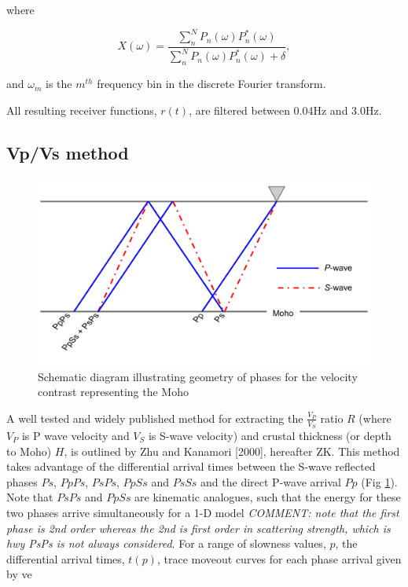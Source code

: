 \documentclass[draft, 12pt]{article}
\begin{document}
where

\begin{equation}
  X(\omega) = \frac {\sum_n^N P_n(\omega)P_n^*(\omega)} {\sum_n^N P_n(\omega)P_n^*(\omega) + \delta},
\end{equation}

and $\omega_m$ is the $m^{th}$ frequency bin in the discrete Fourier transform.

  All resulting receiver functions, $r(t)$, are filtered between 0.04Hz and 3.0Hz.

\subsection{Vp/Vs method} \label{section:VpVsMethod}

\begin{figure}
  \centering
    \includegraphics[width=\textwidth]{reflectedPhases}
  \caption{Schematic diagram illustrating geometry of phases for the velocity contrast representing the Moho}
  \label{fig:reflectedPhases}
\end{figure}


A well tested and widely published method for extracting the $\frac{V_P}{V_S}$ ratio $R$ (where $V_P$ is P wave velocity and $V_S$ is S-wave velocity) and crustal thickness (or depth to Moho) $H$, is outlined by Zhu and Kanamori [2000], hereafter ZK. This method takes advantage of the differential arrival times between the S-wave reflected phases $Ps$, $PpPs$, $PsPs$, $PpSs$ and $PsSs$ and the direct P-wave arrival $Pp$ (Fig \ref{fig:reflectedPhases}). Note that $PsPs$ and $PpSs$ are kinematic analogues, such that the energy for these two phases arrive simultaneously for a 1-D model {\it COMMENT: note that the first phase is 2nd order whereas the 2nd is first
order in scattering strength, which is hwy PsPs is not always considered}. For a range of slowness values, $p$, the differential arrival times, $t(p)$, trace moveout curves for each phase arrival given by
ve
\end{document}
